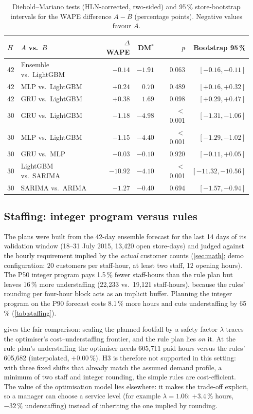 \documentclass[conference]{IEEEtran}
\begin{document}
\begin{table}[t]
\centering
\caption{Diebold--Mariano tests (HLN-corrected, two-sided) and 95\,\% store-bootstrap intervals for the
WAPE difference $A-B$ (percentage points). Negative values favour $A$.}
\label{tab:dm}
\scriptsize
\setlength{\tabcolsep}{3pt}
\begin{tabular}{@{}llrrrr@{}}
\toprule
$H$ & $A$ vs.\ $B$ & $\Delta$WAPE & DM$^\ast$ & $p$ & Bootstrap 95\,\% \\
\midrule
42 & Ensemble vs.\ LightGBM & $-0.14$ & $-1.91$ & 0.063 & $[-0.16, -0.11]$ \\
42 & MLP vs.\ LightGBM & $+0.24$ & $0.70$ & 0.489 & $[+0.16, +0.32]$ \\
42 & GRU vs.\ LightGBM & $+0.38$ & $1.69$ & 0.098 & $[+0.29, +0.47]$ \\
\midrule
30 & GRU vs.\ LightGBM & $-1.18$ & $-4.98$ & $<$0.001 & $[-1.31, -1.06]$ \\
30 & MLP vs.\ LightGBM & $-1.15$ & $-4.40$ & $<$0.001 & $[-1.29, -1.02]$ \\
30 & GRU vs.\ MLP & $-0.03$ & $-0.10$ & 0.920 & $[-0.11, +0.05]$ \\
30 & LightGBM vs.\ SARIMA & $-10.92$ & $-4.10$ & $<$0.001 & $[-11.32, -10.56]$ \\
30 & SARIMA vs.\ ARIMA & $-1.27$ & $-0.40$ & 0.694 & $[-1.57, -0.94]$ \\
\bottomrule
\end{tabular}
\end{table}

\subsection{Staffing: integer program versus rules}\label{sec:results-staffing}
The plans were built from the 42-day ensemble forecast for the last 14 days of its validation window
(18--31 July 2015, 13,420 open store-days) and judged against the hourly requirement implied by the
\emph{actual} customer counts (\cref{sec:math}; demo configuration: 20 customers per staff-hour,
at least two staff, 12 opening hours). The P50 integer program pays 1.5\,\% fewer staff-hours than the
rule plan but leaves 16\,\% more understaffing (22,233 vs.\ 19,121 staff-hours), because the rules'
rounding per four-hour block acts as an implicit buffer. Planning the integer program on the P90
forecast costs 8.1\,\% more hours and cuts understaffing by 65\,\% (\cref{tab:staffing}).

 gives the fair comparison: scaling the planned footfall by a safety factor
$\lambda$ traces the optimiser's cost--understaffing frontier, and the rule plan lies \emph{on} it.
At the rule plan's understaffing the optimiser needs 605,711 paid hours versus the rules' 605,682
(interpolated, $+0.00\,\%$). H3 is therefore not supported in this setting: with three fixed shifts that
already match the assumed demand profile, a minimum of two staff and integer rounding, the simple rules
are cost-efficient. The value of the optimisation model lies elsewhere: it makes the trade-off
explicit, so a manager can choose a service level (for example $\lambda=1.06$: $+3.4\,\%$ hours,
$-32\,\%$ understaffing) instead of inheriting the one implied by rounding.
\end{document}
